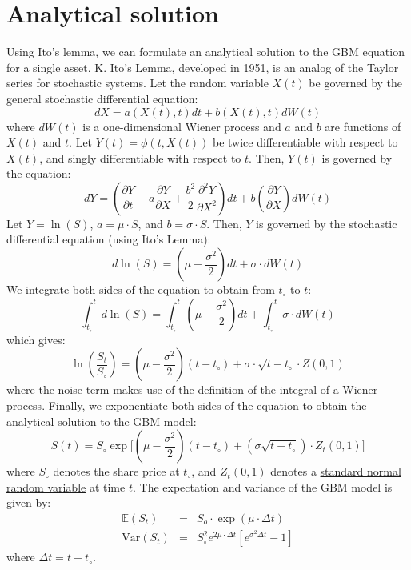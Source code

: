 \documentclass[11pt]{article}
\theoremstyle{definition}
\begin{document}
\section*{Analytical solution}
Using Ito's lemma, we can formulate an analytical solution to the GBM equation for a single asset.
K. Ito's Lemma, developed in 1951, is an analog of the Taylor series for stochastic systems.
Let the random variable $X(t)$ be governed by the general stochastic differential equation:
\begin{equation*}
dX = a\left(X(t),t\right)dt + b\left(X(t),t\right)dW(t)
\end{equation*}
where $dW(t)$ is a one-dimensional Wiener process and $a$ and $b$ are functions of $X(t)$ and $t$. 
Let $Y(t) = \phi\left(t,X(t)\right)$ be twice differentiable with respect to $X(t)$, 
and singly differentiable with respect to $t$. Then, $Y(t)$ is governed by the equation:
\begin{equation*}
dY = \left(\frac{\partial{Y}}{\partial{t}}+a\frac{\partial{Y}}{\partial{X}}+\frac{b^{2}}{2}\frac{\partial^{2}{Y}}{\partial{X}^{2}}\right)dt+b\left(\frac{\partial{Y}}{\partial{X}}\right)dW(t)
\end{equation*}
Let $Y = \ln(S)$, $a = \mu\cdot{S}$, and $b = \sigma\cdot{S}$. 
Then, $Y$ is governed by the stochastic differential equation (using Ito's Lemma):
\begin{equation*}
d\ln(S) = \left(\mu - \frac{\sigma^{2}}{2}\right)dt + \sigma\cdot{dW(t)}
\end{equation*}
We integrate both sides of the equation to obtain from $t_{\circ}$ to $t$:
\begin{equation*}
\int_{t_{\circ}}^{t}d\ln(S) = \int_{t_{\circ}}^{t}\left(\mu - \frac{\sigma^{2}}{2}\right)dt + \int_{t_{\circ}}^{t}\sigma\cdot{dW(t)}
\end{equation*}
which gives:
\begin{equation*}
\ln\left(\frac{S_{t}}{S_{\circ}}\right) = \left(\mu - \frac{\sigma^{2}}{2}\right)\left(t - t_{\circ}\right) + \sigma\cdot\sqrt{t-t_{\circ}}\cdot{Z(0,1)}
\end{equation*}
where the noise term makes use of the definition of the integral of a Wiener process.
Finally, we exponentiate both sides of the equation to obtain the analytical solution to the GBM model:
\begin{equation}\label{eqn:analytical-soln-GBM}
S(t) = S_{\circ}\exp\Biggl[\left(\mu-\frac{\sigma^{2}}{2}\right)\left(t - t_{\circ}\right) + (\sigma\sqrt{t-t_{\circ}})\cdot{Z_{t}(0,1)}\Biggr]
\end{equation}
where $S_{\circ}$ denotes the share price at $t_{\circ}$, and $Z_{t}(0,1)$ denotes a 
\href{https://en.wikipedia.org/wiki/Normal_distribution#Standard_normal_distribution}{standard normal random variable} at time $t$.
The expectation and variance of the GBM model is given by:
\begin{eqnarray*}
\mathbb{E}\left(S_{t}\right) &=& S_{o}\cdot\exp\left(\mu\cdot\Delta{t}\right)\\
\text{Var}\left(S_{t}\right) &=& S_{\circ}^{2}e^{2\mu\cdot\Delta{t}}\left[e^{\sigma^{2}{\Delta{t}}} - 1\right]
\end{eqnarray*}
where $\Delta{t} = t - t_{\circ}$.
\end{document}
